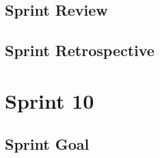 \documentclass{report}
\begin{document}
    \section{Sprint Review}
        
    \section{Sprint Retrospective}
        
        
    \chapter{Sprint 10}
    \section{Sprint Goal}
        
    
    
    
    

\nocite{*} %
\end{document}
